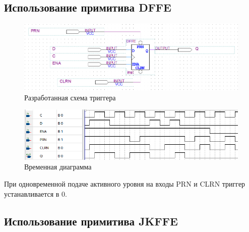 \documentclass[a4paper,12pt]{article}
\begin{document}
    \subsection{Использование примитива DFFE}
    \begin{figure}[H]
		\centering
		\includegraphics[width=\linewidth]{polytech/scheme/report-lab3/subfiles/images/scheme-3}
		\caption{Разработанная схема триггера}
		\label{fig:scheme-3}
	\end{figure}
    \begin{figure}[H]
		\centering
		\includegraphics[width=\linewidth]{polytech/scheme/report-lab3/subfiles/images/wave-3}
		\caption{Временная диаграмма}
		\label{fig:wave-3}
	\end{figure}
    При одновременной подаче активного уровня на входы PRN и CLRN триггер устанавливается в 0.
    \subsection{Использование примитива JKFFE}
    
\end{document}
